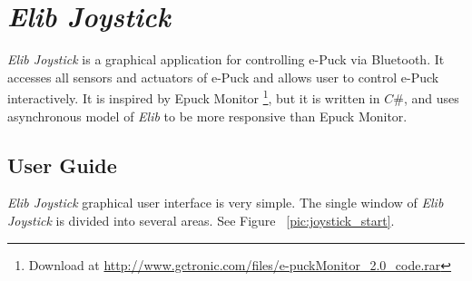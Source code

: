 \chapter{{\it Elib Joystick}} \label{app:joystick}
  {\it Elib Joystick} is a graphical application for controlling e-Puck via Bluetooth.
  It accesses all sensors and actuators of e-Puck and allows user to control e-Puck interactively.
  It is inspired by Epuck Monitor 
  \footnote{\small{Download at \url{http://www.gctronic.com/files/e-puckMonitor_2.0_code.rar}}},
  but it is written in $C\#$, and uses asynchronous model
  of {\it Elib} to be more responsive than Epuck Monitor.

  \section{User Guide} \label{sec:joyguide}
  {\it Elib Joystick} graphical user interface is very simple. The single window of {\it Elib Joystick} 
  is divided into several areas.
  See Figure ~\ref{pic:joystick_start}.

